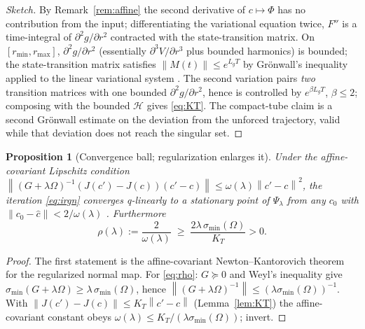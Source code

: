 \documentclass[11pt]{article}
\theoremstyle{plain}
\newtheorem{proposition}[theorem]{Proposition}
\theoremstyle{definition}
\theoremstyle{remark}
\newcommand{\norm}[1]{\left\lVert#1\right\rVert}
\begin{document}
\begin{proof}[Sketch]
By Remark~\ref{rem:affine} the second derivative of $c\mapsto\Phi$ has no
contribution from the input; differentiating the variational equation
twice, $F''$ is a time-integral of $\partial^{2}g/\partial r^{2}$
contracted with the state-transition matrix. On $[r_{\min},r_{\max}]$,
$\partial^{2}g/\partial r^{2}$ (essentially $\partial^{3}V/\partial
r^{3}$ plus bounded harmonics) is bounded; the state-transition matrix
satisfies $\norm{M(t)}\le e^{L_gT}$ by Gr\"onwall's inequality applied to
the linear variational system \cite{hairer1993,ortega1970}. The second
variation pairs \emph{two} transition matrices with one bounded
$\partial^{2}g/\partial r^{2}$, hence is controlled by $e^{\beta L_gT}$,
$\beta\le2$; composing with the bounded $\mathcal H$ gives \eqref{eq:KT}.
The compact-tube claim is a second Gr\"onwall estimate on the deviation
from the unforced trajectory, valid while that deviation does not reach
the singular set.
\end{proof}

\begin{proposition}[Convergence ball; regularization enlarges it]
\label{prop:ball}
Under the affine-covariant Lipschitz condition
$\norm{(G+\lambda\Omega)^{-1}(J(c')-J(c))(c'-c)}\le\omega(\lambda)
\norm{c'-c}^{2}$, the iteration \eqref{eq:irgn} converges q-linearly to a
stationary point of $\Psi_\lambda$ from any $c_0$ with
$\norm{c_0-\hat c}<2/\omega(\lambda)$ \cite{deuflhard2004,nocedal2006}.
Furthermore
\begin{equation}
\rho(\lambda):=\frac{2}{\omega(\lambda)}\;\ge\;
\frac{2\lambda\,\sigma_{\min}(\Omega)}{K_T}>0 .
\label{eq:rho}
\end{equation}
\end{proposition}

\begin{proof}
The first statement is the affine-covariant Newton--Kantorovich theorem
\cite{deuflhard2004} for the regularized normal map. For
\eqref{eq:rho}: $G\succeq0$ and Weyl's inequality give
$\sigma_{\min}(G+\lambda\Omega)\ge\lambda\,\sigma_{\min}(\Omega)$, hence
$\norm{(G+\lambda\Omega)^{-1}}\le(\lambda\sigma_{\min}(\Omega))^{-1}$.
With $\norm{J(c')-J(c)}\le K_T\norm{c'-c}$
(Lemma~\ref{lem:KT}) the affine-covariant constant obeys
$\omega(\lambda)\le K_T/(\lambda\sigma_{\min}(\Omega))$; invert.
\end{proof}
\end{document}
